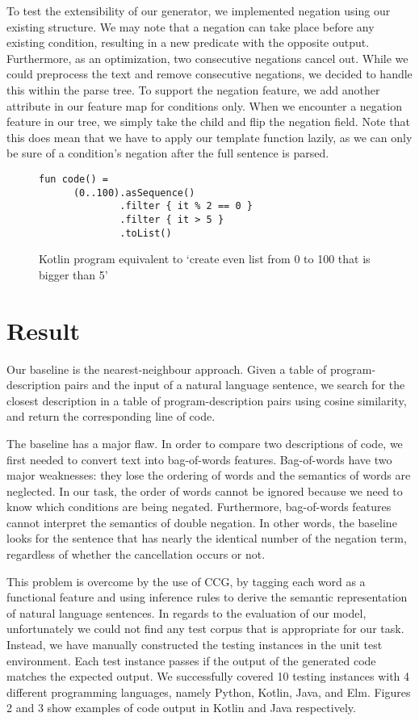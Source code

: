 \documentclass[11pt,letterpaper]{article}
\begin{document}
To test the extensibility of our generator, we implemented negation using our existing structure.
We may note that a negation can take place before any existing condition, resulting in a new predicate with the opposite output.
Furthermore, as an optimization, two consecutive negations cancel out. 
While we could preprocess the text and remove consecutive negations, we decided to handle this within the parse tree.
To support the negation feature, we add another attribute in our feature map for conditions only.
When we encounter a negation feature in our tree, we simply take the child and flip the negation field.
Note that this does mean that we have to apply our template function lazily, as we can only be sure of a condition's negation after the full sentence is parsed.

\begin{figure}[t!]
  \small
  \begin{verbatim}
fun code() =
      (0..100).asSequence()
              .filter { it % 2 == 0 }
              .filter { it > 5 }
              .toList()
  \end{verbatim}
  \caption{Kotlin program equivalent to `create even list from 0 to 100 that is bigger than 5'}
\end{figure}

\section{Result}

Our baseline is the nearest-neighbour approach. 
Given a table of program-description pairs and the input of a natural language sentence, we search for the closest description in a table of program-description pairs using cosine similarity, and return the corresponding line of code.

The baseline has a major flaw. 
In order to compare two descriptions of code, we first needed to convert text into bag-of-words features. 
Bag-of-words have two major weaknesses: they lose the ordering of words and the semantics of words are neglected. 
In our task, the order of words cannot be ignored because we need to know which conditions are being negated. 
Furthermore, bag-of-words features cannot interpret the semantics of double negation. 
In other words, the baseline looks for the sentence that has nearly the identical number of the negation term, regardless of whether the cancellation occurs or not.

This problem is overcome by the use of CCG, by tagging each word as a functional feature and using inference rules to derive the semantic representation of natural language sentences. 
In regards to the evaluation of our model, unfortunately we could not find any test corpus that is appropriate for our task. 
Instead, we have manually constructed the testing instances in the unit test environment. 
Each test instance passes if the output of the generated code matches the expected output. 
We successfully covered 10 testing instances with 4 different programming languages, namely Python, Kotlin, Java, and Elm. 
Figures 2 and 3 show examples of code output in Kotlin and Java respectively. 
\end{document}
